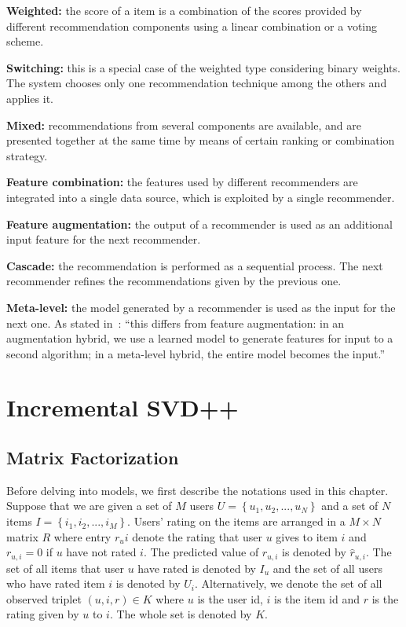 \documentclass[oneside,13pt]{extreport}
\begin{document}
\begin{description}
    \item{\textbf{Weighted:}}  the score of a item is a combination of the scores provided by different recommendation components  using a linear combination or a voting scheme. 
    \item{\textbf{Switching:}} this is a special case of the weighted type considering binary weights. The system chooses only one recommendation technique among the others and applies it. 
    \item{\textbf{Mixed:}} recommendations from several components are available, and are presented together at the same time by means of certain ranking or combination strategy.
    \item{\textbf{Feature combination:}} the features used by different recommenders are integrated into a single data source, which is exploited by a single recommender.
    \item{\textbf{Feature augmentation:}} the output of a recommender is used as an additional input feature for the next recommender.
    \item{\textbf{Cascade:}} the recommendation is performed as a sequential process. The next recommender refines the recommendations given by the previous one. 
    \item{\textbf{Meta-level:}} the model generated by a recommender is used as the input for the next one. As stated in~\cite{Burke02}: “this differs from feature augmentation: in an augmentation hybrid, we use a learned model to generate features for input to a second algorithm; in a meta-level hybrid, the entire model becomes the input.”
\end{description}

\chapter{Incremental SVD++}
\label{ISVD++_chapter}

\section{Matrix Factorization}
Before delving into models, we first describe the notations used in this chapter. Suppose that we are given
a set of $M$ users $U = \left\{ {{u_1},{u_2},...,{u_N}} \right\}$ and a set of $N$ items $I = \left\{ {{i_1},{i_2},...,{i_M}} \right\}$. Users’ rating on the items are arranged in a $M \times N$ matrix $R$ where entry $r_ui$ denote the rating that user $u$ gives to item $i$ and $r_{u,i} = 0$ if $u$ have not rated $i$. The predicted value of $r_{u,i}$ is denoted by $\hat r_{u,i}$. The set of all items that user $u$
have rated is denoted by $I_u$ and the set of all users who have rated item $i$ is denoted by $U_i$. Alternatively, we denote the set of all observed
triplet $\left( {u,i,r} \right) \in K$  where $u$ is the user id, $i$ is the item id
and $r$ is the rating given by $u$ to $i$. The whole set is denoted by $K$. 
\end{document}
